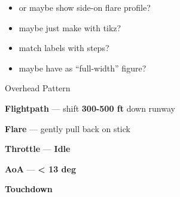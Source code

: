\begin{checklistenumerate}
{{{\begin{minipage}[t][80mm][t]{\marginparwidth}
\begin{itemize}[leftmargin=1em]
\begin{itemize}
                    \end{itemize}
                    \item or maybe show side-on flare profile?
                    \item maybe just make with tikz?
                    \item match labels with steps?
                    \item maybe have as ``full-width'' figure?
                \end{itemize}
            \end{minipage}
        }
        \caption{Overhead Pattern}
    }
    \begin{subitemize}
        \item \textbf{Flightpath} --- shift \textbf{300-500 ft} down runway
        \item \textbf{Flare} --- gently pull back on stick
        \item \textbf{Throttle} --- \textbf{Idle}
        \item \textbf{AoA} --- \textbf{< 13 deg}
        \item \textbf{Touchdown}
    \end{subitemize}}
\end{checklistenumerate}

